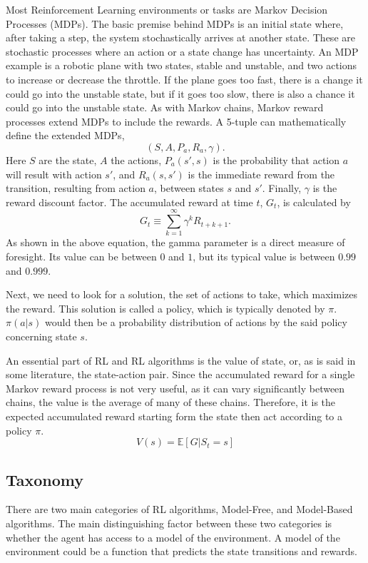 \documentclass{article}
\begin{document}
Most Reinforcement Learning environments or tasks are Markov Decision Processes (MDPs). The basic premise behind MDPs is an initial state where, after taking a step, the system stochastically arrives at another state. These are stochastic processes where an action or a state change has uncertainty. An MDP example is a robotic plane with two states, stable and unstable, and two actions to increase or decrease the throttle. If the plane goes too fast, there is a change it could go into the unstable state, but if it goes too slow, there is also a chance it could go into the unstable state. As with Markov chains, Markov reward processes extend MDPs to include the rewards.
A 5-tuple can mathematically define the extended MDPs, $$(S, A, P_a, R_a, \gamma).$$ Here $S$ are the state, $A$ the actions, $P_a(s',s)$ is the probability that action $a$ will result with action $s'$, and $R_a(s,s')$ is the immediate reward from the transition, resulting from action $a$, between states $s$ and $s'$. Finally, $\gamma$ is the reward discount factor. The accumulated reward at time $t$, $G_t$, is calculated by $$G_t\equiv \sum_{k=1}^\infty \gamma^k R_{t+k+1}.$$ As shown in the above equation, the gamma parameter is a direct measure of foresight. Its value can be between $0$ and $1$, but its typical value is between $0.99$ and $0.999$.

Next, we need to look for a solution, the set of actions to take, which maximizes the reward. This solution is called a policy, which is typically denoted by $\pi$. $\pi(a|s)$ would then be a probability distribution of actions by the said policy concerning state $s$. 

An essential part of RL and RL algorithms is the value of state, or, as is said in some literature, the state-action pair. Since the accumulated reward for a single Markov reward process is not very useful, as it can vary significantly between chains, the value is the average of many of these chains. Therefore, it is the expected accumulated reward starting form the state then act according to a policy $\pi$. $$V(s)=\mathbb{E}[G|S_t=s]$$ 

\subsection{Taxonomy}

There are two main categories of RL algorithms, Model-Free, and Model-Based algorithms. The main distinguishing factor between these two categories is whether the agent has access to a model of the environment. A model of the environment could be a function that predicts the state transitions and rewards.
\end{document}
